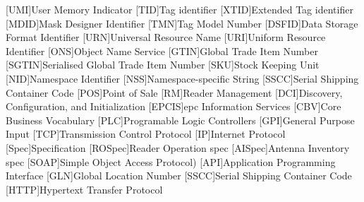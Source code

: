 \begin{multicols}{2}
\begin{acronym}[AAAAAA]
	[UMI]{User Memory Indicator}
	[TID]{Tag identifier}
	[XTID]{Extended Tag identifier}
	[MDID]{Mask Designer Identifier}
	[TMN]{Tag Model Number}
	[DSFID]{Data Storage Format Identifier}
	[URN]{Universal Resource Name}
	[URI]{Uniform Resource Identifier}
	[ONS]{Object Name Service}
	[GTIN]{Global Trade Item Number}
	[SGTIN]{Serialised Global Trade Item Number}
	[SKU]{Stock Keeping Unit}
	[NID]{Namespace Identifier}
	[NSS]{Namespace-specific String}
	[SSCC]{Serial Shipping Container Code}
	[POS]{Point of Sale}
	[RM]{Reader Management}
	[DCI]{Discovery, Configuration, and 
	Initialization}
	[EPCIS]{\ac{epc} Information Services}
	[CBV]{Core Business Vocabulary}
	[PLC]{Programable Logic Controllers}
	[GPI]{General Purpose Input}
	[TCP]{Transmission Control Protocol}
	[IP]{Internet Protocol}
	[Spec]{Specification}
	[ROSpec]{Reader Operation \acs{spec}}
	[AISpec]{Antenna Inventory \acs{spec}}
	[SOAP]{Simple Object Access Protocol)}
	[API]{Application Programming Interface}
	[GLN]{Global Location Number}
	[SSCC]{Serial Shipping Container Code}
	[HTTP]{Hypertext Transfer Protocol}
\end{acronym}
\end{multicols}

